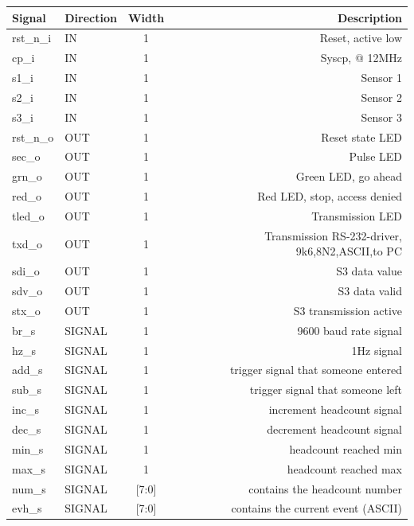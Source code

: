 \documentclass[12pt,a4 paper] {report}
\begin{document}
\begin{center}
	\begin{tabular}{|l|l|c|r|}
		\hline
		\textbf{Signal} & \textbf{Direction} & \textbf{Width} & \textbf{Description} \\
		\hline
		\hline
		rst\_n\_i & IN & 1 & Reset, active low \\
		\hline
		cp\_i & IN & 1 & Syscp, @ 12MHz \\
		\hline
		s1\_i & IN & 1 & Sensor 1 \\
		\hline
		s2\_i & IN & 1 & Sensor 2 \\
		\hline
		s3\_i & IN & 1 & Sensor 3 \\
		\hline
		rst\_n\_o & OUT & 1 & Reset state LED \\
		\hline
		sec\_o & OUT & 1 & Pulse LED \\
		\hline
		grn\_o & OUT & 1 & Green LED, go ahead \\
		\hline
		red\_o & OUT & 1 & Red LED, stop, access denied \\
		\hline
		tled\_o & OUT & 1 & Transmission LED \\
		\hline
		txd\_o & OUT & 1 & Transmission RS-232-driver, 9k6,8N2,ASCII,to PC \\
		\hline
		sdi\_o & OUT & 1 & S3 data value \\
		\hline
		sdv\_o & OUT & 1 & S3 data valid \\
		\hline
		stx\_o & OUT & 1 & S3 transmission active \\
		\hline
		\hline
		br\_s & SIGNAL & 1 & 9600 baud rate signal \\
		\hline
		hz\_s & SIGNAL & 1 & 1Hz signal \\
		\hline
		add\_s & SIGNAL & 1 & trigger signal that someone entered \\
		\hline
		sub\_s & SIGNAL & 1 & trigger signal that someone left \\
		\hline
		inc\_s & SIGNAL & 1 & increment headcount signal \\
		\hline
		dec\_s & SIGNAL & 1 & decrement headcount signal \\
		\hline
		min\_s & SIGNAL & 1 & headcount reached min \\
		\hline
		max\_s & SIGNAL & 1 & headcount reached max \\
		\hline
		num\_s & SIGNAL & [7:0] & contains the headcount number \\
		\hline
		evh\_s & SIGNAL & [7:0] & contains the current event (ASCII) \\
		\hline
	\end{tabular}
\end{center}
\end{document}
